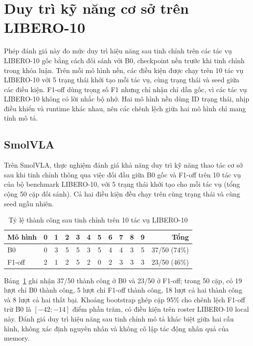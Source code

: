 \section{Duy trì kỹ năng cơ sở trên LIBERO-10}
\label{sec:e6-retention}

Phép đánh giá này đo mức duy trì hiệu năng sau tinh chỉnh trên các tác vụ LIBERO-10 gốc bằng cách đối sánh với B0, checkpoint nền trước khi tinh chỉnh trong khóa luận. Trên mỗi mô hình nền, các điều kiện được chạy trên 10 tác vụ LIBERO-10 với 5 trạng thái khởi tạo mỗi tác vụ, cùng trạng thái và seed giữa các điều kiện. F1-off dùng trọng số F1 nhưng chỉ nhận chỉ dẫn gốc, vì các tác vụ LIBERO-10 không có lời nhắc bộ nhớ. Hai mô hình nền dùng ID trạng thái, nhịp điều khiển và runtime khác nhau, nên các chênh lệch giữa hai mô hình chỉ mang tính mô tả.

\subsection{SmolVLA}

Trên SmolVLA, thực nghiệm đánh giá khả năng duy trì kỹ năng thao tác cơ sở sau khi tinh chỉnh thông qua việc đối đầu giữa B0 gốc và F1-off trên 10 tác vụ của bộ benchmark LIBERO-10, với 5 trạng thái khởi tạo cho mỗi tác vụ (tổng cộng 50 cặp đối sánh). Cả hai điều kiện đều chạy trên cùng trạng thái và cùng seed ngẫu nhiên.

\begin{table}[htbp]
\centering\small
\caption{Tỷ lệ thành công sau tinh chỉnh trên 10 tác vụ LIBERO-10}
\label{tab:e6-retention-results}
\begin{tabular}{l*{10}{c}r}
\toprule
\textbf{Mô hình} & \textbf{0} & \textbf{1} & \textbf{2} & \textbf{3} & \textbf{4} & \textbf{5} & \textbf{6} & \textbf{7} & \textbf{8} & \textbf{9} & \textbf{Tổng} \\
\midrule
B0     & 0 & 3 & 5 & 5 & 3 & 5 & 4 & 4 & 3 & 5 & 37/50 (74\%) \\
F1-off & 2 & 1 & 2 & 5 & 2 & 0 & 2 & 3 & 3 & 3 & 23/50 (46\%) \\
\bottomrule
\end{tabular}
\end{table}

Bảng~\ref{tab:e6-retention-results} ghi nhận 37/50 thành công ở B0 và 23/50 ở F1-off; trong 50 cặp, có 19 lượt chỉ B0 thành công, 5 lượt chỉ F1-off thành công, 18 lượt cả hai thành công và 8 lượt cả hai thất bại. Khoảng bootstrap ghép cặp 95\% cho chênh lệch F1-off trừ B0 là $[-42;-14]$ điểm phần trăm, có điều kiện trên roster LIBERO-10 local này. Đánh giá duy trì hiệu năng sau tinh chỉnh mô tả khác biệt giữa hai cấu hình, không xác định nguyên nhân và không cô lập tác động nhân quả của memory.

